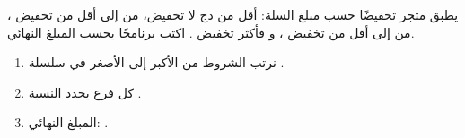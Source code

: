 \begin{statement}
يطبق متجر تخفيضًا حسب مبلغ السلة: أقل من  دج لا تخفيض، من  إلى أقل من  تخفيض ، من  إلى أقل من  تخفيض ، و فأكثر تخفيض . اكتب برنامجًا يحسب المبلغ النهائي.
\end{statement}
\begin{stepsbox}\begin{enumerate}
\item نرتب الشروط من الأكبر إلى الأصغر في سلسلة .
\item كل فرع يحدد النسبة .
\item المبلغ النهائي: .
\end{enumerate}\end{stepsbox}
